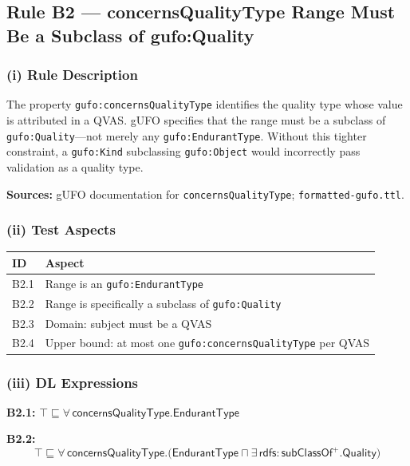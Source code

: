 \documentclass[12pt,a4paper]{article}
\newcommand{\gufoclass}[1]{\nolinkurl{gufo:#1}}
\newcommand{\gufoprop}[1]{\nolinkurl{gufo:#1}}
\begin{document}
\subsection{Rule B2 --- concernsQualityType Range Must Be a Subclass of gufo:Quality}
\label{sec:rule-b2}

\subsubsection*{(i) Rule Description}

The property \gufoprop{concernsQualityType} identifies the quality type whose
value is attributed in a QVAS. gUFO specifies that the range must be a subclass
of \gufoclass{Quality}---not merely any \gufoclass{EndurantType}. Without this
tighter constraint, a \gufoclass{Kind} subclassing \gufoclass{Object} would
incorrectly pass validation as a quality type.

\textbf{Sources:} gUFO documentation for \texttt{concernsQualityType};
\texttt{formatted-gufo.ttl}.

\subsubsection*{(ii) Test Aspects}

\begin{tabular}{lL{9.5cm}}
  \toprule
  \textbf{ID} & \textbf{Aspect} \\
  \midrule
  B2.1 & Range is an \gufoclass{EndurantType} \\
  B2.2 & Range is specifically a subclass of \gufoclass{Quality} \\
  B2.3 & Domain: subject must be a QVAS \\
  B2.4 & Upper bound: at most one \gufoprop{concernsQualityType} per QVAS \\
  \bottomrule
\end{tabular}

\subsubsection*{(iii) DL Expressions}

\textbf{B2.1:}
$\top \sqsubseteq \forall\,\mathsf{concernsQualityType}.\mathsf{EndurantType}$

\textbf{B2.2:}
\begin{equation*}
  \top \sqsubseteq \forall\,\mathsf{concernsQualityType}.
  \bigl(\mathsf{EndurantType} \sqcap \exists\,\mathsf{rdfs{:}subClassOf}^{+}.\mathsf{Quality}\bigr)
\end{equation*}
\end{document}
